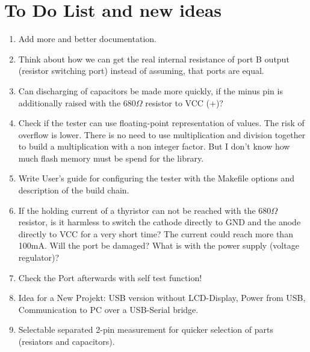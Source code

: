 
\chapter{To Do List and new ideas}
\label{sec:todo}

\begin{enumerate}
\item Add more and better documentation.
\item Think about how we can get the real internal resistance of port B output (resistor switching port) instead of assuming, that ports are equal.
\item Can discharging of capacitors be made more quickly, if the minus pin is additionally raised
with the \(680\Omega\) resistor to VCC (+)?
\item Check if the tester can use floating-point representation of  values. The risk of overflow  is lower.
There is no need to use multiplication and division together to build a multiplication with a non integer factor.
But I don't know how much flash memory must be spend for the library.
\item Write User's guide for configuring the tester with the Makefile options and description of the build chain.
\item If the holding current of a thyristor can not be reached with the \(680\Omega\) resistor, is it harmless to switch the cathode directly to GND
and the anode directly to VCC for a very short time?
The current could reach more than 100mA. Will the port be damaged? What is with the power supply (voltage regulator)?
\item Check the Port afterwards with self test function!
\item Idea for a New Projekt: USB  version without LCD-Display, Power from USB, Communication to PC over a USB-Serial bridge.
\item Selectable separated 2-pin measurement for quicker selection of parts (resiators and capacitors).

\end{enumerate}
